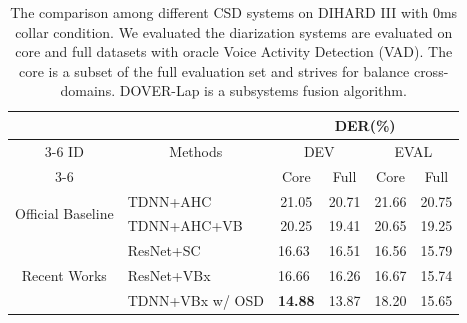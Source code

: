 \documentclass[10pt]{article}
\begin{document}
\begin{table}[]
\centering
\tabcolsep=0.5cm
\caption{The comparison among different CSD systems on DIHARD III with 0ms collar condition. We evaluated the diarization systems are evaluated on core and full datasets with oracle Voice Activity Detection (VAD). The core is a subset of the full evaluation set and strives for balance cross-domains. DOVER-Lap \cite{raj2021dover} is a subsystems fusion algorithm.}
\label{tab:systems}
\begin{tabular}{clcccc}
\hline
                                            & \multicolumn{1}{c}{}                                   & \multicolumn{4}{c}{DER(\%)}                                                                                   \\ \cline{3-6} 
ID                                   & \multicolumn{1}{c}{Methods}                            & \multicolumn{2}{c}{DEV}                               & \multicolumn{2}{c}{EVAL}                              \\ \cline{3-6} 
                                            & \multicolumn{1}{c}{}                                   & Core                   & Full                      & Core                      & Full                      \\ \hline
\multirow{2}{*}{Official Baseline\cite{ryant2020third}} & TDNN+AHC                                               & 21.05                     & 20.71                     & 21.66                     & 20.75                     \\
                                            & TDNN+AHC+VB                                            & 20.25                     & 19.41                     & 20.65                     & 19.25                     \\ \hline
\multirow{4}{*}{Recent Works}               & ResNet+SC\cite{landini2021but}                              & \multicolumn{1}{l}{16.63} & \multicolumn{1}{l}{16.51} & \multicolumn{1}{l}{16.56} & \multicolumn{1}{l}{15.79} \\
                                            & ResNet+VBx\cite{landini2021but}                             & \multicolumn{1}{l}{16.66} & \multicolumn{1}{l}{16.26} & \multicolumn{1}{l}{16.67} & \multicolumn{1}{l}{15.74} \\
                                            & TDNN+VBx w/ OSD\cite{horiguchi2021hitachi}    & \multicolumn{1}{l}{\textbf{14.88}} & \multicolumn{1}{l}{13.87} & \multicolumn{1}{l}{18.20} & \multicolumn{1}{l}{15.65} \\

\end{tabular}
\end{table}
\end{document}
